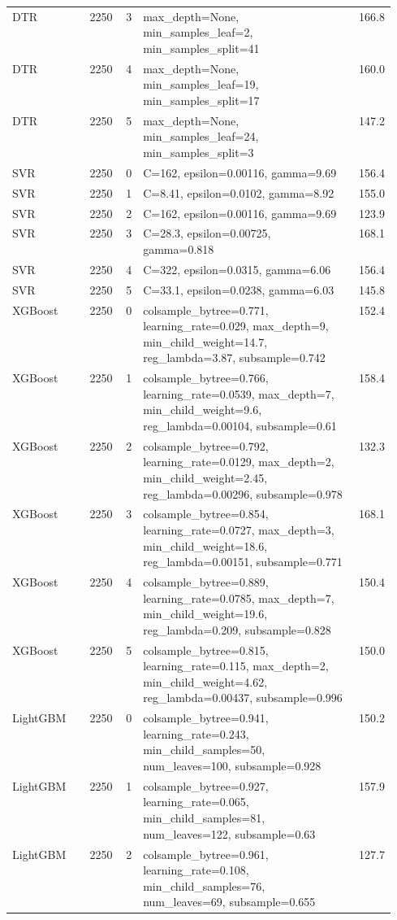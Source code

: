 \begin{longtable}{lrrp{0.55\linewidth}r}
DTR & 2250 & 3 & max\_depth=None, min\_samples\_leaf=2, min\_samples\_split=41 & 166.8 \\
DTR & 2250 & 4 & max\_depth=None, min\_samples\_leaf=19, min\_samples\_split=17 & 160.0 \\
DTR & 2250 & 5 & max\_depth=None, min\_samples\_leaf=24, min\_samples\_split=3 & 147.2 \\
SVR & 2250 & 0 & C=162, epsilon=0.00116, gamma=9.69 & 156.4 \\
SVR & 2250 & 1 & C=8.41, epsilon=0.0102, gamma=8.92 & 155.0 \\
SVR & 2250 & 2 & C=162, epsilon=0.00116, gamma=9.69 & 123.9 \\
SVR & 2250 & 3 & C=28.3, epsilon=0.00725, gamma=0.818 & 168.1 \\
SVR & 2250 & 4 & C=322, epsilon=0.0315, gamma=6.06 & 156.4 \\
SVR & 2250 & 5 & C=33.1, epsilon=0.0238, gamma=6.03 & 145.8 \\
XGBoost & 2250 & 0 & colsample\_bytree=0.771, learning\_rate=0.029, max\_depth=9, min\_child\_weight=14.7, reg\_lambda=3.87, subsample=0.742 & 152.4 \\
XGBoost & 2250 & 1 & colsample\_bytree=0.766, learning\_rate=0.0539, max\_depth=7, min\_child\_weight=9.6, reg\_lambda=0.00104, subsample=0.61 & 158.4 \\
XGBoost & 2250 & 2 & colsample\_bytree=0.792, learning\_rate=0.0129, max\_depth=2, min\_child\_weight=2.45, reg\_lambda=0.00296, subsample=0.978 & 132.3 \\
XGBoost & 2250 & 3 & colsample\_bytree=0.854, learning\_rate=0.0727, max\_depth=3, min\_child\_weight=18.6, reg\_lambda=0.00151, subsample=0.771 & 168.1 \\
XGBoost & 2250 & 4 & colsample\_bytree=0.889, learning\_rate=0.0785, max\_depth=7, min\_child\_weight=19.6, reg\_lambda=0.209, subsample=0.828 & 150.4 \\
XGBoost & 2250 & 5 & colsample\_bytree=0.815, learning\_rate=0.115, max\_depth=2, min\_child\_weight=4.62, reg\_lambda=0.00437, subsample=0.996 & 150.0 \\
LightGBM & 2250 & 0 & colsample\_bytree=0.941, learning\_rate=0.243, min\_child\_samples=50, num\_leaves=100, subsample=0.928 & 150.2 \\
LightGBM & 2250 & 1 & colsample\_bytree=0.927, learning\_rate=0.065, min\_child\_samples=81, num\_leaves=122, subsample=0.63 & 157.9 \\
LightGBM & 2250 & 2 & colsample\_bytree=0.961, learning\_rate=0.108, min\_child\_samples=76, num\_leaves=69, subsample=0.655 & 127.7 \\

\end{longtable}
